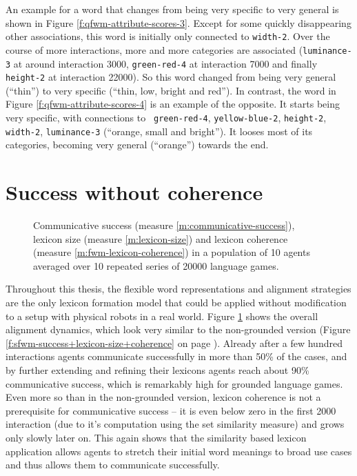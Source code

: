 An example for a word that changes from being very specific to very
general is shown in Figure
\ref{f:qfwm-attribute-scores-3}. Except for some
quickly disappearing other associations, this word is initially only
connected to {\tt width-2}.  Over the course of more interactions,
more and more categories are associated ({\tt luminance-3} at around
interaction 3000, {\tt green-red-4} at interaction 7000 and finally
{\tt height-2} at interaction 22000).  So this word changed from being
very general (``thin'') to very specific (``thin, low, bright and
red''). In contrast, the word in Figure
\ref{f:qfwm-attribute-scores-4} is an example of
the opposite. It starts being very specific, with connections to {\tt
  green-red-4}, {\tt yellow-blue-2}, {\tt height-2}, {\tt width-2},
{\tt luminance-3} (``orange, small and bright'').  It looses most of
its categories, becoming very general (``orange'') towards the end.



\section{Success without coherence}


\begin{figure}[t]
  \caption{Comm\-unicative success (measure
    \ref{m:communicative-success}), lexicon size (measure
    \ref{m:lexicon-size}) and lexicon coherence (measure
    \ref{m:fwm-lexicon-coherence}) in a population of 10 agents
    averaged over 10 repeated series of 20000 language games.}
  \label{f:gfwm-success+lexicon-size+coherence}
\end{figure}


Throughout this thesis, the flexible word representations and
alignment strategies are the only lexicon formation model that could
be applied without modification to a setup with physical robots in a
real world. Figure \ref{f:gfwm-success+lexicon-size+coherence} shows
the overall alignment dynamics, which look very similar to the
non-grounded version (Figure
\ref{f:sfwm-success+lexicon-size+coherence} on page
\pageref{f:sfwm-success+lexicon-size+coherence}). Already after a few
hundred interactions agents communicate successfully in more than 50\%
of the cases, and by further extending and refining their lexicons
agents reach about 90\% communicative success, which is remarkably
high for grounded language games. Even more so than in the
non-grounded version, lexicon coherence is not a prerequisite for
communicative success -- it is even below zero in the first 2000
interaction (due to it's computation using the set similarity measure)
and grows only slowly later on. This again shows that the similarity
based lexicon application allows agents to stretch their initial word
meanings to broad use cases and thus allows them to communicate
successfully.


